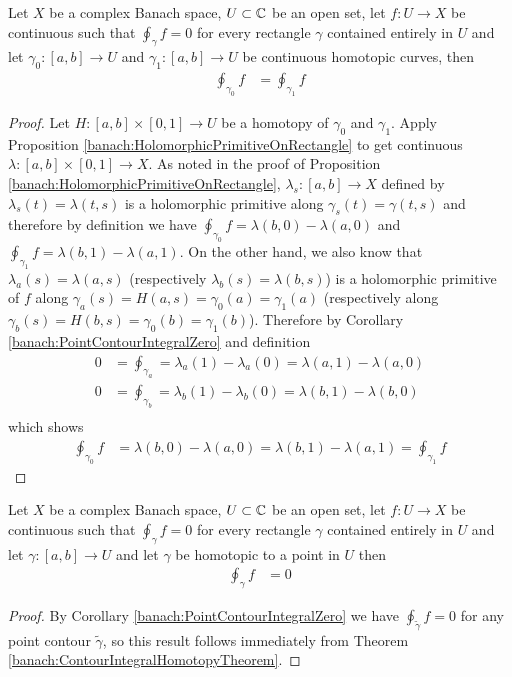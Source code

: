 \begin{thm}\label{banach:ContourIntegralHomotopyTheorem}Let $X$ be a complex Banach space, $U \subset \mathbb{C}$ be an open set, let $f: U \to X$ be continuous such that $\oint_\gamma f = 0$ for every rectangle $\gamma$ contained entirely in $U$ and let  $\gamma_0 : [a,b] \to U$ and $\gamma_1: [a,b] \to U$ be continuous homotopic curves, then
  \begin{align*}
   \oint_{\gamma_0} f &= \oint_{\gamma_1} f
  \end{align*}
\end{thm}
\begin{proof}
  Let $H : [a,b] \times [0,1] \to U$ be a homotopy of $\gamma_0$ and
  $\gamma_1$.   Apply Proposition
  \ref{banach:HolomorphicPrimitiveOnRectangle} to get continuous $\lambda : [a,b] \times [0,1] \to X$.  As noted in the proof of Proposition \ref{banach:HolomorphicPrimitiveOnRectangle}, $\lambda_s : [a,b] \to X$ defined by $\lambda_s(t) = \lambda(t,s)$ is a holomorphic primitive along $\gamma_s(t) = \gamma(t,s)$ and therefore by definition we have $\oint_{\gamma_0} f = \lambda(b,0) - \lambda(a, 0)$ and $\oint_{\gamma_1} f = \lambda(b,1) - \lambda(a, 1)$.   On the other hand, we also know that $\lambda_a(s) = \lambda(a,s)$ (respectively $\lambda_b(s) = \lambda(b,s)$) is a holomorphic primitive of $f$ along $\gamma_a(s) = H(a,s) = \gamma_0(a) = \gamma_1(a)$ (respectively along $\gamma_b(s) = H(b,s) = \gamma_0(b) = \gamma_1(b)$).   Therefore by Corollary \ref{banach:PointContourIntegralZero}  and definition
  \begin{align*}
    0 &= \oint_{\gamma_a} = \lambda_a(1) - \lambda_a(0) = \lambda(a, 1) - \lambda(a, 0) \\
    0 &= \oint_{\gamma_b} = \lambda_b(1) - \lambda_b(0) = \lambda(b, 1) - \lambda(b, 0) \\
  \end{align*}
  which shows
  \begin{align*}
    \oint_{\gamma_0} f &= \lambda(b,0) - \lambda(a, 0) = \lambda(b,1) - \lambda(a, 1)  = \oint_{\gamma_1} f
  \end{align*}
\end{proof}

\begin{thm}\label{banach:CauchysTheorem}Let $X$ be a complex Banach space, $U \subset \mathbb{C}$ be an open set, let $f: U \to X$ be continuous such that $\oint_\gamma f = 0$ for every rectangle $\gamma$ contained entirely in $U$ and let  $\gamma : [a,b] \to U$ and let $\gamma$ be homotopic to a point in $U$ then
  \begin{align*}
   \oint_{\gamma} f &= 0
  \end{align*}
\end{thm}
\begin{proof}
  By Corollary \ref{banach:PointContourIntegralZero} we have $\oint_{\tilde{\gamma}} f = 0$ for any point contour $\tilde{\gamma}$, so this result follows immediately from Theorem \ref{banach:ContourIntegralHomotopyTheorem}.
\end{proof}

